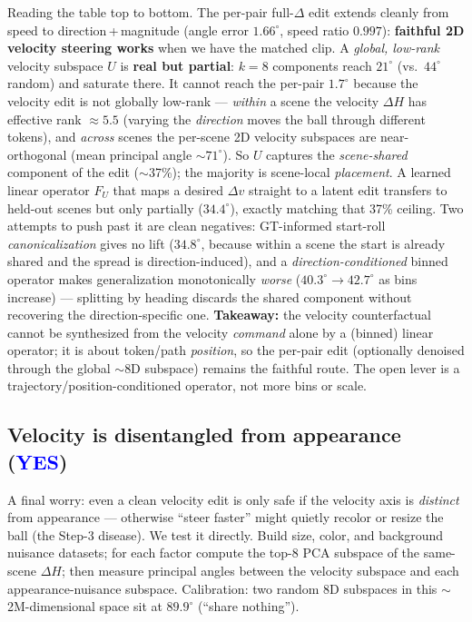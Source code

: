 \documentclass{article} %
\begin{document}
  Reading the table top to bottom. The per-pair full-$\Delta$ edit extends cleanly from speed to
  direction\,+\,magnitude (angle error $1.66^\circ$, speed ratio $0.997$): \textbf{faithful 2D velocity
  steering works} when we have the matched clip. A \emph{global, low-rank} velocity subspace $U$ is
  \textbf{real but partial}: $k{=}8$ components reach $21^\circ$ (vs.\ $44^\circ$ random) and saturate
  there. It cannot reach the per-pair $1.7^\circ$ because the velocity edit is not globally low-rank ---
  \emph{within} a scene the velocity $\Delta H$ has effective rank $\approx5.5$ (varying the
  \emph{direction} moves the ball through different tokens), and \emph{across} scenes the per-scene 2D
  velocity subspaces are near-orthogonal (mean principal angle $\sim71^\circ$). So $U$ captures the
  \emph{scene-shared} component of the edit ($\sim$37\%); the majority is scene-local \emph{placement}.
  A learned linear operator $F_U$ that maps a desired $\Delta v$ straight to a latent edit transfers to
  held-out scenes but only partially ($34.4^\circ$), exactly matching that 37\% ceiling. Two attempts to
  push past it are clean negatives: GT-informed start-roll \emph{canonicalization} gives no lift
  ($34.8^\circ$, because within a scene the start is already shared and the spread is direction-induced),
  and a \emph{direction-conditioned} binned operator makes generalization monotonically \emph{worse}
  ($40.3^\circ\rightarrow42.7^\circ$ as bins increase) --- splitting by heading discards the shared
  component without recovering the direction-specific one. \textbf{Takeaway:} the velocity counterfactual
  cannot be synthesized from the velocity \emph{command} alone by a (binned) linear operator; it is about
  token/path \emph{position}, so the per-pair edit (optionally denoised through the global $\sim$8D
  subspace) remains the faithful route. The open lever is a trajectory/position-conditioned operator,
  not more bins or scale.

  \subsection{Velocity is disentangled from appearance
      (\textcolor{blue}{YES})}
  A final worry: even a clean velocity edit is only safe if the velocity axis is \emph{distinct} from
  appearance --- otherwise ``steer faster'' might quietly recolor or resize the ball (the Step-3 disease).
  We test it directly. Build size, color, and background nuisance datasets; for each factor compute the
  top-8 PCA subspace of the same-scene $\Delta H$; then measure principal angles between the velocity
  subspace and each appearance-nuisance subspace. Calibration: two random 8D subspaces in this
  $\sim$2M-dimensional space sit at $89.9^\circ$ (``share nothing'').
\end{document}
